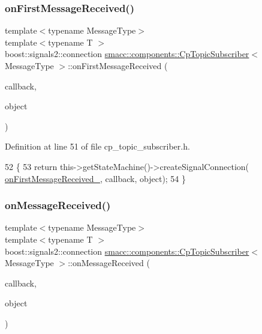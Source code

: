 \subsubsection{\texorpdfstring{on\+First\+Message\+Received()}{onFirstMessageReceived()}}
{\footnotesize\ttfamily template$<$typename Message\+Type$>$ \\
template$<$typename T $>$ \\
boost\+::signals2\+::connection \hyperlink{classsmacc_1_1components_1_1CpTopicSubscriber}{smacc\+::components\+::\+Cp\+Topic\+Subscriber}$<$ Message\+Type $>$\+::on\+First\+Message\+Received (\begin{DoxyParamCaption}\item[{void(T\+::$\ast$)(const Message\+Type \&)}]{callback,  }\item[{T $\ast$}]{object }\end{DoxyParamCaption})\hspace{0.3cm}{\ttfamily [inline]}}



Definition at line 51 of file cp\+\_\+topic\+\_\+subscriber.\+h.


\begin{DoxyCode}
52     \{
53         \textcolor{keywordflow}{return} this->getStateMachine()->createSignalConnection(
      \hyperlink{classsmacc_1_1components_1_1CpTopicSubscriber_ab8e319857951489298faefa4882e49cc}{onFirstMessageReceived\_}, callback, \textcolor{keywordtype}{object});
54     \}
\end{DoxyCode}
\mbox{\label{classsmacc_1_1components_1_1CpTopicSubscriber_af8f626a4ef4aa6ff699359f136372292}} 
\subsubsection{\texorpdfstring{on\+Message\+Received()}{onMessageReceived()}}
{\footnotesize\ttfamily template$<$typename Message\+Type$>$ \\
template$<$typename T $>$ \\
boost\+::signals2\+::connection \hyperlink{classsmacc_1_1components_1_1CpTopicSubscriber}{smacc\+::components\+::\+Cp\+Topic\+Subscriber}$<$ Message\+Type $>$\+::on\+Message\+Received (\begin{DoxyParamCaption}\item[{void(T\+::$\ast$)(const Message\+Type \&)}]{callback,  }\item[{T $\ast$}]{object }\end{DoxyParamCaption})\hspace{0.3cm}{\ttfamily [inline]}}



